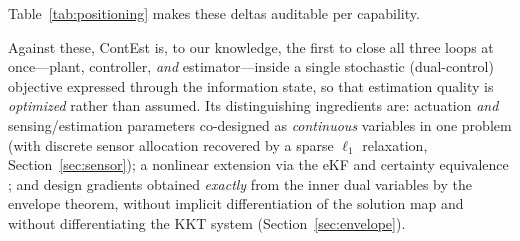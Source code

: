 \documentclass[twocolumn,amsthm]{autart}
\begin{document}
Table~\ref{tab:positioning} makes these deltas auditable per capability.

\begin{table}[t]
\centering
\caption{Positioning of ContEst against the nearest lines of work, by capability
(\checkmark\ present, \ absent, \emph{partial} limited). ``Estimator
itself designed'' means tuning a \emph{dynamic} estimator (e.g.\ a PLL bandwidth,
or the noise level $V(\theta)$), not only choosing sensors.}
\label{tab:positioning}
\small
{}
\end{table}

Against these, ContEst is, to our knowledge, the first to close all three loops
at once---plant, controller, \emph{and} estimator---inside a single stochastic
(dual-control) objective expressed through the information state, so that
estimation quality is \emph{optimized} rather than assumed. Its distinguishing
ingredients are: actuation \emph{and} sensing/estimation parameters co-designed as
\emph{continuous} variables in one problem (with discrete sensor allocation
recovered by a sparse $\ell_1$ relaxation, Section~\ref{sec:sensor}); a nonlinear
extension via the eKF and certainty equivalence \cite{ramadan2024extended}; and
design gradients obtained \emph{exactly} from the inner dual variables by the
envelope theorem, without implicit differentiation of the solution map and
without differentiating the KKT system (Section~\ref{sec:envelope}).
\end{document}
